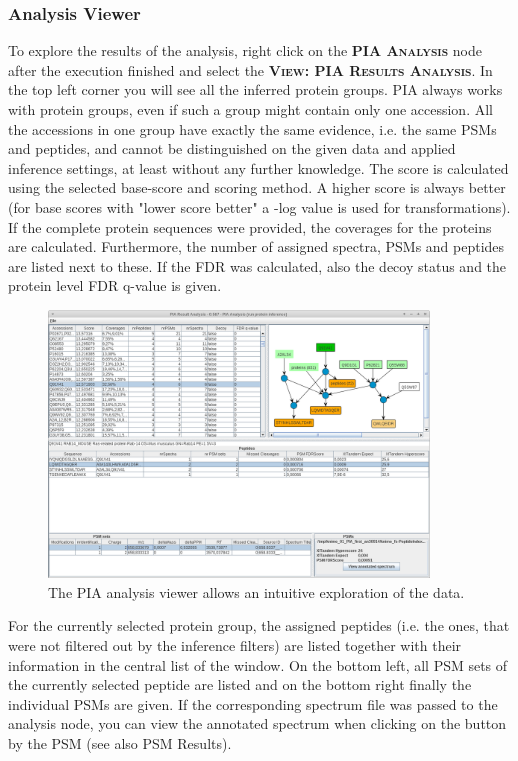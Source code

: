 \documentclass[a4paper,11pt,twoside]{article}
\newcommand{\menu}[1]{{\scshape\bfseries #1}}
\newcommand{\knimenode}[1]{{\scshape\bfseries #1}}
\begin{document}
\subsubsection{Analysis Viewer}

To explore the results of the analysis, right click on the \knimenode{PIA
Analysis} node after the execution finished and select the \menu{View: PIA
Results Analysis}. In the top left corner you will see all the inferred protein
groups. PIA always works with protein groups, even if such a group might
contain only one accession. All the accessions in one group have exactly the
same evidence, i.e. the same PSMs and peptides, and cannot be distinguished on
the given data and applied inference settings, at least without any further
knowledge. The score is calculated using the selected base-score and scoring
method. A higher score is always better (for base scores with "lower score
better" a -log value is used for transformations). If the complete protein
sequences were provided, the coverages for the proteins are calculated.
Furthermore, the number of assigned spectra, PSMs and peptides are listed next
to these. If the FDR was calculated, also the decoy status and the protein level
FDR q-value is given.

\begin{figure}[ht!]
	\centering
	\includegraphics[width=0.9\textwidth]{graphics/screenshot_PIA_analysis}
	\caption{The PIA analysis viewer allows an intuitive exploration of the
	data.}
	\label{pia_analysis}
\end{figure}

For the currently selected protein group, the assigned peptides (i.e. the ones,
that were not filtered out by the inference filters) are listed together with
their information in the central list of the window. On the bottom left, all
PSM sets of the currently selected peptide are listed and on the bottom right
finally the individual PSMs are given. If the corresponding spectrum file was
passed to the analysis node, you can view the annotated spectrum when clicking
on the button by the PSM (see also PSM Results).
\end{document}
